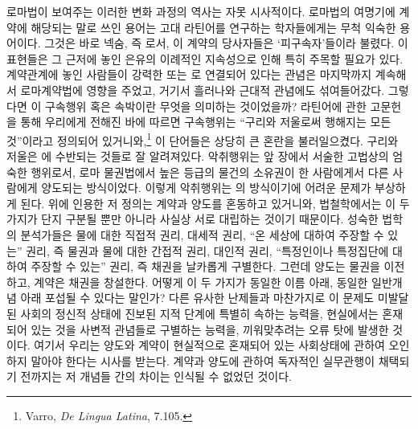 로마법이 보여주는 이러한 변화 과정의 역사는 자못 시사적이다.
로마법의 여명기에
계약에 해당되는 말로 쓰인 용어는
고대 라틴어를 연구하는 학자들에게는 무척 익숙한 용어이다.
그것은 바로 넥숨, 즉 로서,
이 계약의 당사자들은 `피구속자'들이라 불렸다.
이 표현들은 그 근저에 놓인 은유의 이례적인 지속성으로 인해
특히 주목할 필요가 있다.
계약관계에 놓인 사람들이 강력한 
또는 로 연결되어 있다는
관념은 마지막까지 계속해서 로마계약법에 영향을 주었고,
거기서 흘러나와 근대적 관념에도 섞여들어갔다.
그렇다면 이 구속행위 혹은 속박이란 무엇을 의미하는 것이었을까?
라틴어에 관한 고문헌을 통해 우리에게 전해진 바에 따르면
구속행위는 ``구리와 저울로써 행해지는
모든 것''이라고
정의되어 있거니와,\footnote{%
  \latinmarks
  Varro, \textit{De Lingua Latina}, 7.105.
  }
이 단어들은 상당히 큰 혼란을 불러일으켰다.
구리와 저울은
에 수반되는 것들로 잘 알려져있다.
악취행위는
앞 장에서 서술한 고법상의 엄숙한 행위로서,
로마 물권법에서 높은 등급의 물건의 소유권이
한 사람에게서 다른 사람에게 양도되는 방식이었다.
이렇게 악취행위는 의 방식이기에
어려운 문제가 부상하게 된다.
위에 인용한 저 정의는
계약과 양도를 혼동하고 있거니와,
법철학에서는 이 두 가지가 단지 구분될 뿐만 아니라
사실상 서로 대립하는 것이기 때문이다.
성숙한 법학의 분석가들은
물에 대한 직접적 권리,
대세적 권리,
``온 세상에 대하여 주장할 수 있는'' 권리,
즉 물권과
물에 대한 간접적 권리,
대인적 권리,
``특정인이나 특정집단에 대하여 주장할 수 있는'' 권리,
즉 채권을
날카롭게 구별한다.
그런데 양도는 물권을 이전하고, 계약은 채권을 창설한다.
어떻게 이 두 가지가 동일한 이름 아래, 동일한 일반개념 아래
포섭될 수 있다는 말인가?
다른 유사한 난제들과 마찬가지로 이 문제도
미발달된 사회의 정신적 상태에
진보된 지적 단계에 특별히 속하는 능력을,
현실에서는 혼재되어 있는 것을 사변적 관념들로 구별하는 능력을,
끼워맞추려는
오류 탓에 발생한 것이다.
여기서
우리는
양도와 계약이 현실적으로 혼재되어 있는 사회상태에 관하여
오인하지 말아야 한다는 시사를 받는다.
계약과 양도에 관하여 독자적인 실무관행이 채택되기 전까지는
저 개념들 간의 차이는 인식될 수 없었던 것이다.

